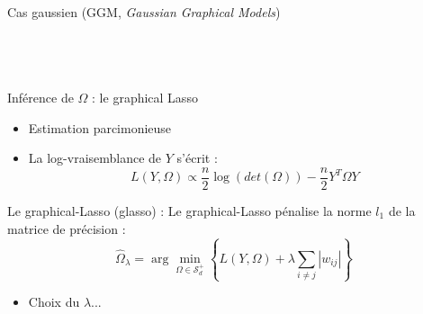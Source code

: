 \documentclass{bredelebeamer}
\begin{document}
\begin{frame}{Cas gaussien (GGM, \textit{Gaussian Graphical Models})}
{\begin{columns}
\begin{column}{0.45\linewidth}
\begin{flushleft}
\\
\end{flushleft}
 \end{column}

\end{columns}}
\end{frame}

\begin{frame}{Inférence de $\Omega$ : le graphical Lasso}
\begin{itemize}
 \item  Estimation parcimonieuse
 \item La log-vraisemblance de  $Y$ s'écrit :
 \[L(Y,\Omega) \propto \frac{n}{2}\log(det(\Omega))-\frac{n}{2} Y^T\Omega Y\]
\end{itemize}


 \begin{exampleblock}{ Le graphical-Lasso (glasso) :}
  Le graphical-Lasso pénalise la norme $l_1$ de la matrice de précision :
  \[\widehat{\Omega}_\lambda = \arg\min_{\Omega \in \mathcal{S}_d^+}\left\{ L(Y,\Omega)+\lambda \sum_{i\neq j} |w_{ij}| \right\}\]
 \end{exampleblock}
 \begin{itemize}
  \item Choix du $\lambda$...
 \end{itemize}

\end{frame}
\end{document}
